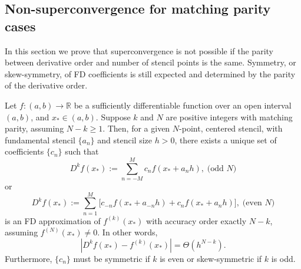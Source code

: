 \documentclass[12pt]{article}
\newcommand{\R}{\mathbb{R}}
\newcommand{\xstar}{x_*}
\newcommand{\FD}{D}
\begin{document}
\subsection{Non-superconvergence for matching parity cases}

In this section we prove that superconvergence is not possible if the parity between derivative order and number of stencil points is the same.
Symmetry, or skew-symmetry, of FD coefficients is still expected and determined by the parity of the derivative order.

%
\begin{theorem} 
Let $f:(a,b)\to\R$ be a sufficiently differentiable function over an open interval $(a,b)$, and $\xstar\in (a,b)$.
Suppose $k$ and $N$ are positive integers with matching parity, assuming $N-k\ge 1$.
Then, for a given $N$-point, centered stencil, with fundamental stencil $\{a_n\}$ and stencil size $h>0$, there exists a unique set of coefficients $\{c_n\}$ such that 
\[
	\FD^k f(\xstar) := \sum_{n=-M}^M c_nf(\xstar+a_nh), \; \text{(odd $N$)}
\]
or 
\[
	\FD^k f(\xstar) := \sum_{n=1}^M\Big[ c_{-n}f(\xstar+a_{-n}h)+c_nf(\xstar+a_nh) \Big],
 \; \text{(even $N$)}
\]
is an FD approximation of $f^{(k)}(\xstar)$ with accuracy order exactly $N-k$, assuming $f^{(N)}(\xstar)\neq 0$.
In other words, 
\[
	\left| \FD^k f(\xstar) - f^{(k)}(\xstar) \right| = \Theta(h^{N-k}).
\]
Furthermore, $\{c_n\}$ must be symmetric if $k$ is even or skew-symmetric if $k$ is odd.
\end{theorem}
%
\end{document}
